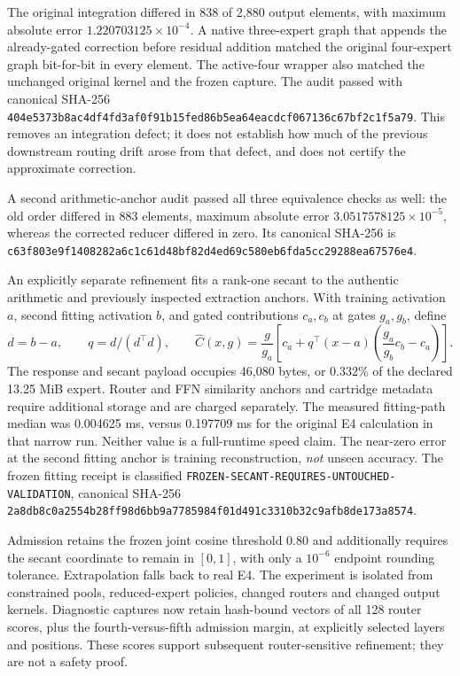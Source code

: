 The original integration differed in 838 of 2,880 output elements, with maximum
absolute error \(1.220703125\times10^{-4}\).  A native three-expert graph that
appends the already-gated correction before residual addition matched the
original four-expert graph bit-for-bit in every element.  The active-four
wrapper also matched the unchanged original kernel and the frozen capture.
The audit passed with canonical SHA-256
\texttt{404e5373b8ac4df4fd3af0f91b15fed86b5ea64eacdcf067136c67bf2c1f5a79}.
This removes an integration defect; it does not establish how much of the
previous downstream routing drift arose from that defect, and does not certify
the approximate correction.

A second arithmetic-anchor audit passed all three equivalence checks as well:
the old order differed in 883 elements, maximum absolute error
\(3.0517578125\times10^{-5}\), whereas the corrected reducer differed in zero.
Its canonical SHA-256 is
\texttt{c63f803e9f1408282a6c1c61d48bf82d4ed69c580eb6fda5cc29288ea67576e4}.

An explicitly separate refinement fits a rank-one secant to the authentic
arithmetic and previously inspected extraction anchors.  With training
activation \(a\), second fitting activation \(b\), and gated contributions
\(c_a,c_b\) at gates \(g_a,g_b\), define
\[
 d=b-a,\qquad q=d/(d^\top d),\qquad
 \widehat C(x,g)=\frac{g}{g_a}
 \left[c_a+q^\top(x-a)\left(\frac{g_a}{g_b}c_b-c_a\right)\right].
\]
The response and secant payload occupies 46,080 bytes, or 0.332\% of the
declared 13.25 MiB expert.  Router and FFN similarity anchors and cartridge
metadata require additional storage and are charged separately.  The measured
fitting-path median was 0.004625 ms, versus 0.197709 ms for the original E4
calculation in that narrow run.  Neither value is a full-runtime speed claim.
The near-zero error at the second fitting anchor is training reconstruction,
\emph{not} unseen accuracy.  The frozen fitting receipt is classified
\texttt{FROZEN-SECANT-REQUIRES-UNTOUCHED-VALIDATION}, canonical SHA-256
\texttt{2a8db8c0a2554b28ff98d6bb9a7785984f01d491c3310b32c9afb8de173a8574}.

Admission retains the frozen joint cosine threshold 0.80 and additionally
requires the secant coordinate to remain in \([0,1]\), with only a
\(10^{-6}\) endpoint rounding tolerance.  Extrapolation falls back to real E4.
The experiment is isolated from constrained pools, reduced-expert policies,
changed routers and changed output kernels.  Diagnostic captures now retain
hash-bound vectors of all 128 router scores, plus the fourth-versus-fifth
admission margin, at explicitly selected layers and positions.  These scores
support subsequent router-sensitive refinement; they are not a safety proof.

